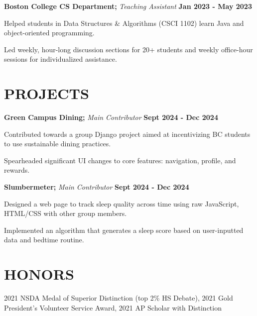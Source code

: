 \documentclass[11pt]{article}
\begin{document}
\raggedright
\textbf{Boston College CS Department;} \textit{Teaching Assistant} \hfill \textbf{Jan 2023 - May 2023}
\begin{sublist}
	\item Helped students in Data Structures \& Algorithms (CSCI 1102) learn Java and object-oriented programming. 
	\item Led weekly, hour-long discussion sections for 20+ students and weekly office-hour sessions for individualized assistance. 
\end{sublist}

\section*{PROJECTS}
\raggedright
\textbf{Green Campus Dining;}  \textit{Main Contributor} \hfill \textbf{Sept 2024 - Dec 2024}
\begin{sublist}
	\item Contributed towards a group Django project aimed at incentivizing BC students to use sustainable dining practices.
	\item Spearheaded significant UI changes to core features: navigation, profile, and rewards.
\end{sublist}

\raggedright
\textbf{Slumbermeter;}  \textit{Main Contributor} \hfill \textbf{Sept 2024 - Dec 2024}
\begin{sublist}
	\item Designed a web page to track sleep quality across time using raw JavaScript, HTML/CSS with other group members.
	\item Implemented an algorithm that generates a sleep score based on user-inputted data and bedtime routine.
\end{sublist}

\section*{HONORS}
2021 NSDA Medal of Superior Distinction (top 2\% HS Debate), 2021 Gold President’s Volunteer Service Award, 2021 AP Scholar with Distinction
\end{document}

